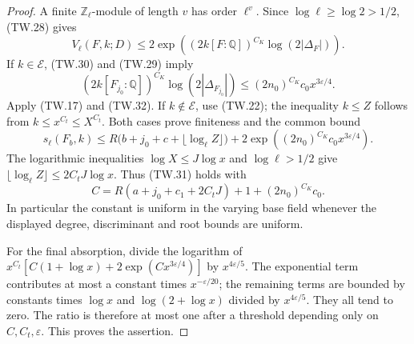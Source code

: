 \begin{proof}
A finite $\mathbb Z_\ell$-module of length $v$ has order
$\ell^v$.  Since $\log\ell\ge\log2>1/2$, (TW.28) gives
\[
 V_\ell(F,k;D)\le
 2\exp\!\left((2k[F:\mathbb Q])^{C_K}
                                  \log(2|\Delta_F|)\right).
 \tag{TW.32}
\]
If $k\in\mathcal E$, (TW.30) and (TW.29) imply
\[
 (2k[F_{j_0}:\mathbb Q])^{C_K}
       \log(2|\Delta_{F_{j_0}}|)
 \le (2n_0)^{C_K}c_0x^{3\varepsilon/4}.                 \tag{TW.33}
\]
Apply (TW.17) and (TW.32).  If $k\notin\mathcal E$, use
(TW.22); the inequality $k\le Z$ follows from
$k\le x^{C_t}\le X^{C_t}$.
Both cases prove finiteness and the common bound
\[
 s_\ell(F_b,k)\le
 R\bigl(b+j_0+c+\lfloor\log_\ell Z\rfloor\bigr)
       +2\exp((2n_0)^{C_K}c_0x^{3\varepsilon/4}).         \tag{TW.34}
\]
The logarithmic inequalities
$\log X\le J\log x$ and
$\log\ell>1/2$ give
$\lfloor\log_\ell Z\rfloor\le2C_tJ\log x$.
Thus (TW.31) holds with
\[
 C=R(a+j_0+c_1+2C_tJ)+1+(2n_0)^{C_K}c_0.
 \tag{TW.35}
\]
In particular the constant is uniform in the varying base
field whenever the displayed degree, discriminant and root
bounds are uniform.

For the final absorption, divide the logarithm of
$x^{C_t}[C(1+\log x)+2\exp(Cx^{3\varepsilon/4})]$
by $x^{4\varepsilon/5}$.
The exponential term contributes at most a constant times
$x^{-\varepsilon/20}$; the remaining terms are bounded by
constants times $\log x$ and $\log(2+\log x)$ divided by
$x^{4\varepsilon/5}$.  They all tend to zero.
The ratio is therefore at most one after a threshold depending
only on $C,C_t,\varepsilon$.  This proves the assertion.
\end{proof}

